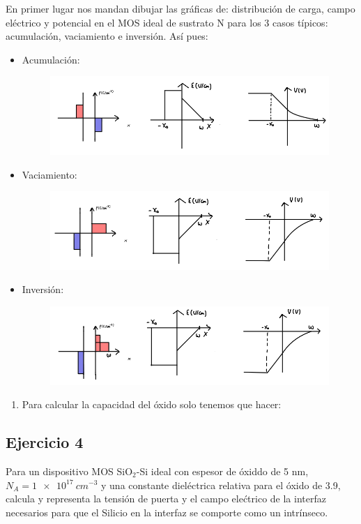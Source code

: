 	En primer lugar nos mandan dibujar las gráficas de: distribución de carga, campo eléctrico y potencial en el MOS ideal de sustrato N para los 3 casos típicos: acumulación, vaciamiento e inversión. Así pues: 
	\begin{itemize}
		\item Acumulación:
		\begin{figure}[H]\centering
			\includegraphics[width=0.8\linewidth]{Ejercicios/Ch_05/Ej_03_a1.png}
		\end{figure}
		\item Vaciamiento:
		\begin{figure}[H]\centering
			\includegraphics[width=0.8\linewidth]{Ejercicios/Ch_05/Ej_03_a2.png}
		\end{figure}
		\item Inversión:
		\begin{figure}[H]\centering
			\includegraphics[width=0.8\linewidth]{Ejercicios/Ch_05/Ej_03_a3.png}
		\end{figure}
	\end{itemize}


\begin{enumerate}[label=\alph*)]
	\item Para calcular la capacidad del óxido solo tenemos que hacer: 
\end{enumerate}



\begin{Enunciado}
	\subsection*{Ejercicio 4}

	Para un dispositivo MOS SiO$_2$-Si ideal con espesor de óxiddo de 5 nm, $N_A = \SI{1e17}{cm^{-3}}$ y una constante dieléctrica relativa para el óxido de 3.9, calcula y representa la tensión de puerta y el campo elećtrico de la interfaz necesarios para que el Silicio en la interfaz se comporte como un intrínseco.
\end{Enunciado}

